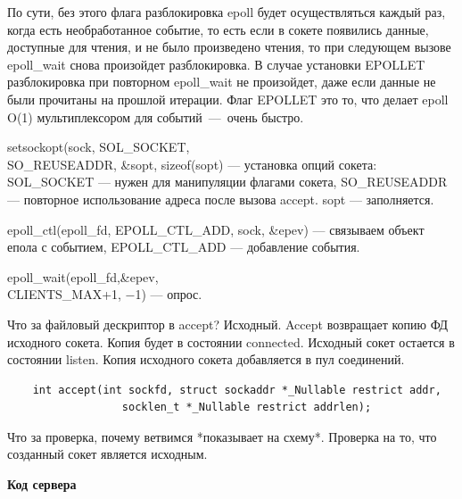 По сути, без этого флага разблокировка epoll будет осуществляться каждый раз, когда есть необработанное событие, то есть если в сокете появились данные, доступные для чтения, и не было произведено чтения, то при следующем вызове epoll\_wait снова произойдет разблокировка. В случае установки EPOLLET разблокировка при повторном epoll\_wait не произойдет, даже если данные не были прочитаны на прошлой итерации. Флаг EPOLLET это то, что делает epoll O(1) мультиплексором для событий~---~очень быстро.

setsockopt(sock, SOL\_SOCKET, \\ SO\_REUSEADDR, \&sopt, sizeof(sopt) --- установка опций сокета: SOL\_SOCKET --- нужен для манипуляции флагами сокета, SO\_REUSEADDR --- повторное использование адреса после вызова accept. sopt --- заполняется.

epoll\_ctl(epoll\_fd, EPOLL\_CTL\_ADD, sock, \&epev) --- связываем объект епола с событием, EPOLL\_CTL\_ADD --- добавление события.

epoll\_wait(epoll\_fd,\&epev, \\ CLIENTS\_MAX+1, −1) --- опрос.

Что за файловый дескриптор в accept? Исходный. Accept возвращает копию ФД исходного сокета. Копия будет в состоянии connected. Исходный сокет остается в состоянии listen. Копия исходного сокета добавляется в пул соединений.

\begin{lstlisting}
	int accept(int sockfd, struct sockaddr *_Nullable restrict addr,
                  socklen_t *_Nullable restrict addrlen);
\end{lstlisting}

Что за проверка, почему ветвимся *показывает на схему*. Проверка на то, что созданный сокет является исходным.

\textbf{Код сервера}

